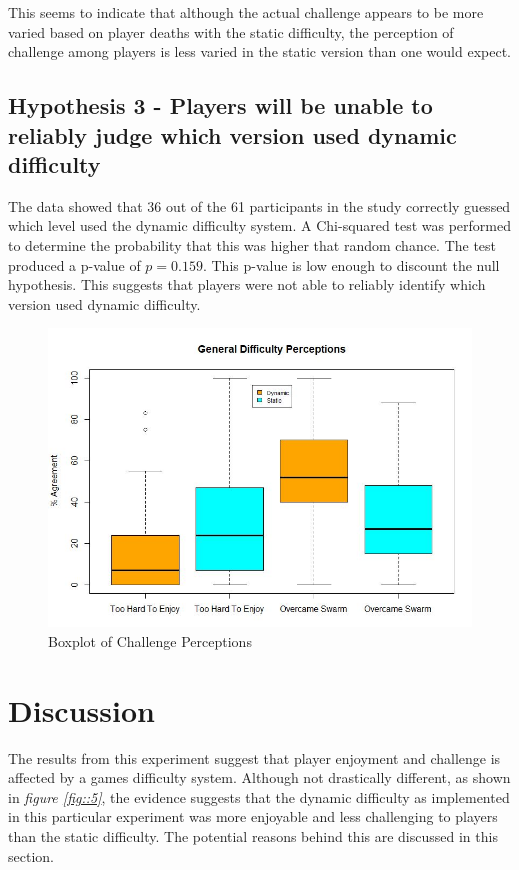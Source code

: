\documentclass[journal]{IEEEtran}
\begin{document}
This seems to indicate that although the actual challenge appears to be more varied based on player deaths with the static difficulty, the perception of challenge among players is less varied in the static version than one would expect.



\subsection{Hypothesis 3 - Players will be unable to reliably judge which version used dynamic difficulty}

The data showed that 36 out of the 61 participants in the study correctly guessed which level used the dynamic difficulty system. A Chi-squared test was performed to determine the probability that this was higher that random chance. The test produced a p-value of $p = 0.159$. This p-value is low enough to discount the null hypothesis. This suggests that players were not able to reliably identify which version used dynamic difficulty.



\begin{figure}[h]
	\includegraphics[width=1.0\linewidth]{difficultyperceptions.jpg}
	\caption{Boxplot of Challenge Perceptions}
	\label{fig::7}
\end{figure} 

\section{Discussion}
The results from this experiment suggest that player enjoyment and challenge is affected by a games difficulty system. Although not drastically different, as shown in \textit{figure \ref{fig::5}}, the evidence suggests that the dynamic difficulty as implemented in this particular experiment was more enjoyable and less challenging to players than the static difficulty. The potential reasons behind this are discussed in this section.
\end{document}
